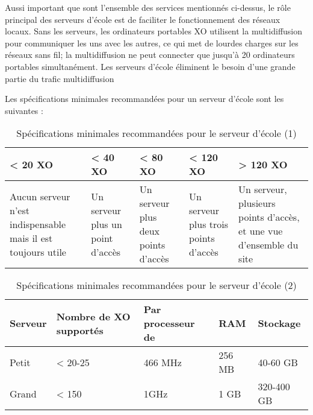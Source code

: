 \documentclass[11pt]{article}
\begin{document}
Aussi important que sont l'ensemble des services mentionnés ci-dessus, le
rôle principal des serveurs d'école est de faciliter le fonctionnement des
réseaux locaux. Sans les serveurs, les ordinateurs portables XO utilisent
la multidiffusion pour communiquer les uns avec les autres, ce qui met de
lourdes charges sur les réseaux sans fil; la multidiffusion ne peut
connecter que jusqu'à 20 ordinateurs portables simultanément. Les serveurs
d'école éliminent le besoin d'une grande partie du trafic multidiffusion

Les spécifications minimales recommandées pour un serveur d'école sont
les suivantes :

\begin{table}[htb]
\caption{Spécifications minimales recommandées pour le serveur d'école (1)} 
\begin{center}
\begin{tabular}{|p{2.5cm}|p{2.5cm}|p{2.5cm}|p{2.5cm}|p{2.5cm}|}
\hline
 < 20 XO                                                       &  < 40 XO                           &  < 80 XO                              &  < 120 XO                              &  > 120 XO                                                             \\
\hline
 Aucun serveur n’est indispensable mais il est toujours utile  &  Un serveur plus un point d’accès  &  Un serveur plus deux points d’accès  &  Un serveur plus trois points d’accès  &  Un serveur, plusieurs points d’accès, et une vue d’ensemble du site  \\
\hline
\end{tabular}
\end{center}
\end{table}



\begin{table}[htb]
\caption{Spécifications minimales recommandées pour le serveur d'école (2)} 
\begin{center}
\begin{tabular}{|l|l|l|l|l|}
\hline
 Serveur  &  Nombre de XO supportés  &  Par processeur de  &  RAM     &  Stockage    \\
\hline
 Petit    &  < 20-25                 &  466 MHz            &  256 MB  &  40-60 GB    \\
 Grand    &  < 150                   &  1GHz               &  1 GB    &  320-400 GB  \\
\hline
\end{tabular}
\end{center}
\end{table}
\end{document}
